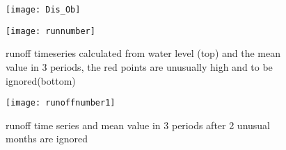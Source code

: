 \begin{figure}[htbp]
	\centering
	\begin{minipage}[t]{0.9\textwidth}
		\centering
		\texttt{[image: Dis\_Ob]} %
	\end{minipage}
	\begin{minipage}[t]{0.9\textwidth}
		\centering
		\texttt{[image: runnumber]} %
	\end{minipage}
	\caption{runoff timeseries calculated from water level (top) and the mean value in 3 periods, the red points are unusually high and to be ignored(bottom)}
	\label{fig:runoff}
\end{figure}
\begin{figure}[htbp]
	\centering
	\texttt{[image: runoffnumber1]} %
	\caption{runoff time series and mean value in 3 periods after 2 unusual months are ignored} 
	\label{fig:rnum2}
\end{figure}\\
\clearpage
